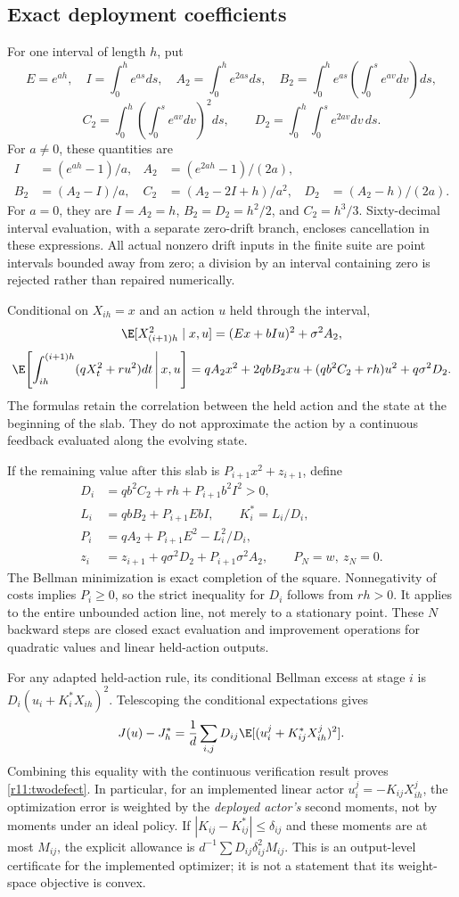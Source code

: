 \subsection{Exact deployment coefficients}
For one interval of length $h$, put
\[
 E=e^{ah},\quad I=\int_0^h e^{as}ds,\quad A_2=\int_0^h e^{2as}ds,
 \quad B_2=\int_0^h e^{as}\!\left(\int_0^s e^{av}dv\right)ds,
\]
\[
 C_2=\int_0^h\left(\int_0^s e^{av}dv\right)^2ds,\qquad
 D_2=\int_0^h\int_0^s e^{2av}dv\,ds.
\]
For $a\ne0$, these quantities are
\begin{align*}
 I&=(e^{ah}-1)/a,& A_2&=(e^{2ah}-1)/(2a),\\
 B_2&=(A_2-I)/a,& C_2&=(A_2-2I+h)/a^2,&D_2&=(A_2-h)/(2a).
\end{align*}
For $a=0$, they are $I=A_2=h$, $B_2=D_2=h^2/2$, and $C_2=h^3/3$. Sixty-decimal interval evaluation, with a separate zero-drift branch, encloses cancellation in these expressions. All actual nonzero drift inputs in the finite suite are point intervals bounded away from zero; a division by an interval containing zero is rejected rather than repaired numerically.

Conditional on $X_{ih}=x$ and an action $u$ held through the interval,
\[
 \E[X_{(i+1)h}^2\mid x,u]=(Ex+bIu)^2+\sigma^2A_2,
\]
\[
 \E\!\left[\int_{ih}^{(i+1)h}(qX_t^2+ru^2)dt\,\middle|\,x,u\right]
 =qA_2x^2+2qbB_2xu+(qb^2C_2+rh)u^2+q\sigma^2D_2.
\]
The formulas retain the correlation between the held action and the state at the beginning of the slab. They do not approximate the action by a continuous feedback evaluated along the evolving state.

If the remaining value after this slab is $P_{i+1}x^2+z_{i+1}$, define
\begin{align*}
 D_i&=qb^2C_2+rh+P_{i+1}b^2I^2>0,\\
 L_i&=qbB_2+P_{i+1}EbI,\qquad K_i^*=L_i/D_i,\\
 P_i&=qA_2+P_{i+1}E^2-L_i^2/D_i,\\
 z_i&=z_{i+1}+q\sigma^2D_2+P_{i+1}\sigma^2A_2,
 \qquad P_N=w,\ z_N=0.
\end{align*}
The Bellman minimization is exact completion of the square. Nonnegativity of costs implies $P_i\geq0$, so the strict inequality for $D_i$ follows from $rh>0$. It applies to the entire unbounded action line, not merely to a stationary point. These $N$ backward steps are closed exact evaluation and improvement operations for quadratic values and linear held-action outputs.

For any adapted held-action rule, its conditional Bellman excess at stage $i$ is $D_i(u_i+K_i^*X_{ih})^2$. Telescoping the conditional expectations gives
\[
 J(u)-J_h^*=\frac1d\sum_{i,j}D_{ij}\E[(u_i^j+K_{ij}^*X^j_{ih})^2].
\]
Combining this equality with the continuous verification result proves \eqref{r11:twodefect}. In particular, for an implemented linear actor $u_i^j=-K_{ij}X^j_{ih}$, the optimization error is weighted by the \emph{deployed actor's} second moments, not by moments under an ideal policy. If $|K_{ij}-K_{ij}^*|\leq\delta_{ij}$ and these moments are at most $M_{ij}$, the explicit allowance is $d^{-1}\sum D_{ij}\delta_{ij}^2M_{ij}$. This is an output-level certificate for the implemented optimizer; it is not a statement that its weight-space objective is convex.

